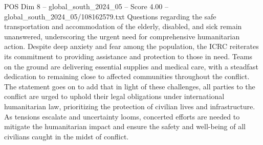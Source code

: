 \begin{textsample}{POS Dim 8 – global\_south\_2024\_05 – Score 4.00 – global\_south\_2024\_05/108162579.txt}
Questions regarding the safe transportation and accommodation of the elderly, disabled, and sick remain unanswered, underscoring the urgent need for comprehensive humanitarian action.
Despite deep anxiety and fear among the population, the ICRC reiterates its commitment to providing assistance and protection to those in need.
Teams on the ground are delivering essential supplies and medical care, with a steadfast dedication to remaining close to affected communities throughout the conflict.
The statement goes on to add that in light of these challenges, all parties to the conflict are urged to uphold their legal obligations under international humanitarian law, prioritizing the protection of civilian lives and infrastructure.
As tensions escalate and uncertainty looms, concerted efforts are needed to mitigate the humanitarian impact and ensure the safety and well-being of all civilians caught in the midst of conflict.

\end{textsample}
